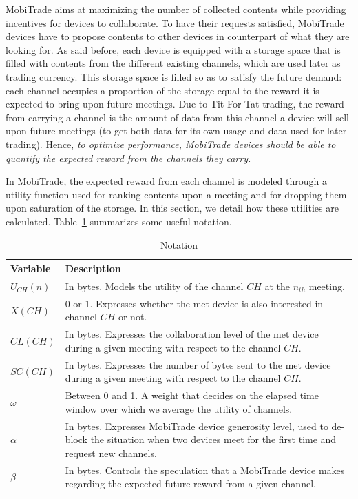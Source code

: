 MobiTrade aims at maximizing the number of collected contents while providing incentives for devices to collaborate. To have their requests satisfied, MobiTrade devices have to propose contents to other devices in counterpart of what they are looking for. As said before, each device is equipped with a storage space that is filled with contents from the different existing channels, which are used later as trading currency. This storage space is filled so as to satisfy the future demand: each channel occupies a proportion of the storage equal to the reward it is expected to bring upon future meetings. Due to Tit-For-Tat trading, the reward from carrying a channel is the amount of data from this channel a device will sell upon future meetings (to get both data for its own usage and data used for later trading). Hence, \emph{to optimize performance, MobiTrade devices should be able to quantify the expected reward from the channels they carry.}

In MobiTrade, the expected reward from each channel is modeled through a utility function used for ranking contents upon a meeting and for dropping them upon saturation of the storage. In this section, we detail how these utilities are calculated. Table~\ref{table:notation} summarizes some useful notation.

\begin{table}
\vspace{-0.1in}
\caption{Notation}
\centering
\label{table:notation}
\footnotesize
\begin{tabular}{|p{2cm}||p{10cm}|}
\hline
\bfseries Variable & \bfseries Description\\
\hline
$U_{CH}(n)$ & In bytes. Models the utility of the channel $CH$ at the $n_{th}$ meeting.\\
\hline
$X(CH)$ & 0 or 1. Expresses whether the met device is also interested in channel $CH$ or not.\\
\hline
$CL(CH)$   & In bytes. Expresses the collaboration level of the met device during a given meeting with respect to the channel $CH$.\\
\hline
$SC(CH)$   & In bytes. Expresses the number of bytes sent to the met device during a given meeting with respect to the channel $CH$.\\
\hline
$\omega$ & Between 0 and 1. A weight that decides on the elapsed time window over which we average the utility of channels.\\
\hline
$\alpha$ & In bytes. Expresses MobiTrade device generosity level, used to de-block the situation when two devices meet for the first time and request new channels.\\
\hline
$\beta$ & In bytes. Controls the speculation that a MobiTrade device makes regarding the expected future reward from a given channel.\\
\hline
\end{tabular}
\end{table}

